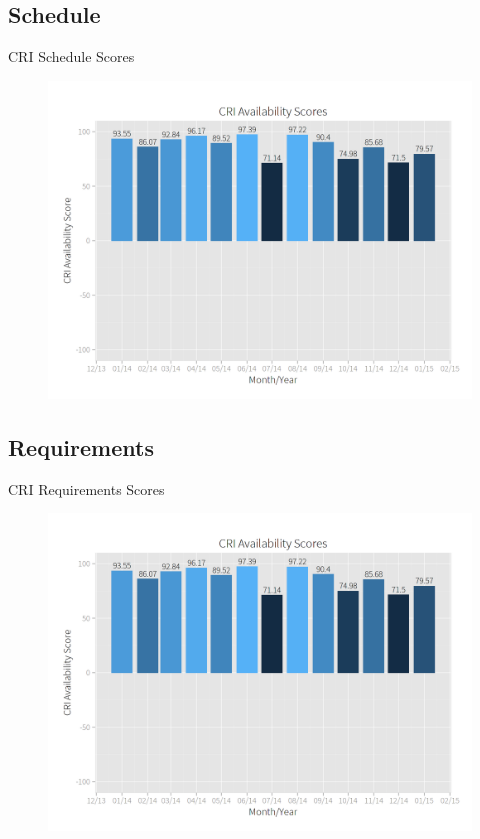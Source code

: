     \subsection{Schedule}
        \begin{frame}{CRI Schedule Scores}
            \begin{figure}
                \centering
                \includegraphics[scale=.23]{images/availability_scores.png}
            \end{figure}
        \end{frame}
    \subsection{Requirements}
        \begin{frame}{CRI Requirements Scores}
            \begin{figure}
                \centering
                \includegraphics[scale=.23]{images/availability_scores.png}
            \end{figure}
        \end{frame}
